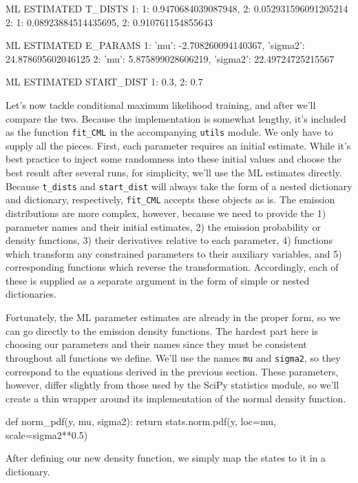 \begin{NotebookOut}
ML ESTIMATED T_DISTS
1: {1: 0.9470684039087948, 2: 0.052931596091205214}
2: {1: 0.08923884514435695, 2: 0.910761154855643}

ML ESTIMATED E_PARAMS
1: {'mu': -2.708260094140367, 'sigma2': 24.878695602046125}
2: {'mu': 5.875899028606219, 'sigma2': 22.49724725215567}

ML ESTIMATED START_DIST
{1: 0.3, 2: 0.7}
\end{NotebookOut}

Let's now tackle conditional maximum likelihood training, and after we'll compare the two. Because the implementation is somewhat lengthy, it's included as the function \texttt{fit\_CML} in the accompanying \texttt{utils} module. We only have to supply all the pieces. First, each parameter requires an initial estimate. While it's best practice to inject some randomness into these initial values and choose the best result after several runs, for simplicity, we'll use the ML estimates directly. Because \texttt{t\_dists} and \texttt{start\_dist} will always take the form of a nested dictionary and dictionary, respectively, \texttt{fit\_CML} accepts these objects as is. The emission distributions are more complex, however, because we need to provide the 1) parameter names and their initial estimates, 2) the emission probability or density functions, 3) their derivatives relative to each parameter, 4) functions which transform any constrained parameters to their auxiliary variables, and 5) corresponding functions which reverse the transformation. Accordingly, each of these is supplied as a separate argument in the form of simple or nested dictionaries.

Fortunately, the ML parameter estimates are already in the proper form, so we can go directly to the emission density functions. The hardest part here is choosing our parameters and their names since they must be consistent throughout all functions we define. We'll use the names \texttt{mu} and \texttt{sigma2}, so they correspond to the equations derived in the previous section. These parameters, however, differ slightly from those used by the SciPy statistics module, so we'll create a thin wrapper around its implementation of the normal density function.

\begin{NotebookIn}
def norm_pdf(y, mu, sigma2):
    return stats.norm.pdf(y, loc=mu, scale=sigma2**0.5)
\end{NotebookIn}

After defining our new density function, we simply map the states to it in a dictionary.


